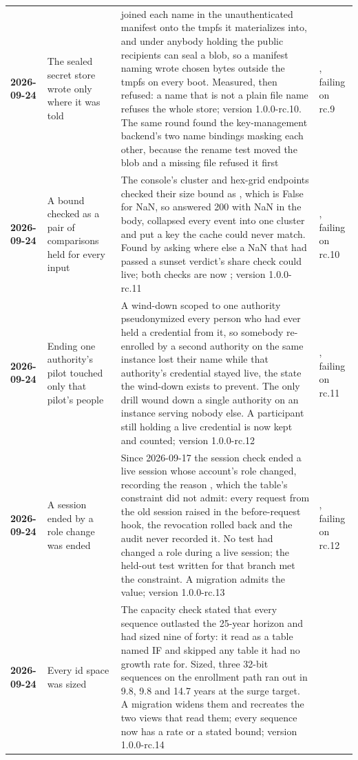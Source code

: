 {\begin{xltabular}{\textwidth}{>{\bfseries\hspace{0pt}}p{0.62in} >{\RaggedRight\arraybackslash\hspace{0pt}}X >{\RaggedRight\arraybackslash\hspace{0pt}}X >{\RaggedRight\arraybackslash\hspace{0pt}}p{1.6in}}
2026-09-24 & The sealed secret store wrote only where it was told &  joined each name in the unauthenticated manifest onto the tmpfs it materializes into, and under  anybody holding the public recipients can seal a blob, so a manifest naming  wrote chosen bytes outside the tmpfs on every boot. Measured, then refused: a name that is not a plain file name refuses the whole store; version 1.0.0-rc.10. The same round found the key-management backend's two name bindings masking each other, because the rename test moved the blob and a missing file refused it first & , failing on rc.9 \\
2026-09-24 & A bound checked as a pair of comparisons held for every input & The console's cluster and hex-grid endpoints checked their size bound as , which is False for NaN, so  answered 200 with NaN in the body, collapsed every event into one cluster and put a key the cache could never match. Found by asking where else a NaN that had passed a sunset verdict's share check could live; both checks are now ; version 1.0.0-rc.11 & , failing on rc.10 \\
2026-09-24 & Ending one authority's pilot touched only that pilot's people & A wind-down scoped to one authority pseudonymized every person who had ever held a credential from it, so somebody re-enrolled by a second authority on the same instance lost their name while that authority's credential stayed live, the state the wind-down exists to prevent. The only drill wound down a single authority on an instance serving nobody else. A participant still holding a live credential is now kept and counted; version 1.0.0-rc.12 & , failing on rc.11 \\
2026-09-24 & A session ended by a role change was ended & Since 2026-09-17 the session check ended a live session whose account's role changed, recording the reason , which the table's constraint did not admit: every request from the old session raised in the before-request hook, the revocation rolled back and the audit never recorded it. No test had changed a role during a live session; the held-out test written for that branch met the constraint. A migration admits the value; version 1.0.0-rc.13 & , failing on rc.12 \\
2026-09-24 & Every id space was sized & The capacity check stated that every sequence outlasted the 25-year horizon and had sized nine of forty: it read  as a table named IF and skipped any table it had no growth rate for. Sized, three 32-bit sequences on the enrollment path ran out in 9.8, 9.8 and 14.7 years at the surge target. A migration widens them and recreates the two views that read them; every sequence now has a rate or a stated bound; version 1.0.0-rc.14 &  \\

\end{xltabular}}
